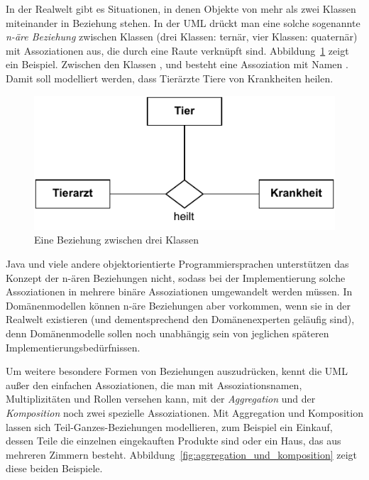 In der Realwelt gibt es Situationen, in denen Objekte von mehr als zwei Klassen miteinander in Beziehung stehen. In der UML drückt man eine solche sogenannte \textit{\mbox{n-äre} Beziehung} zwischen Klassen (\zb drei Klassen: ternär, vier Klassen: quaternär) mit Assoziationen aus, die durch eine Raute verknüpft sind. Abbildung~\ref{fig:tierarzt_tier_krankheit} zeigt ein Beispiel. Zwischen den Klassen ,  und  besteht eine Assoziation mit Namen . Damit soll modelliert werden, dass Tierärzte Tiere von Krankheiten heilen.

\begin{figure}[h!]
	\centering
	\includegraphics{Bilder/Kapitel-4/tierarzt_tier_krankheit.pdf}
	\caption{Eine Beziehung zwischen drei Klassen}
	\label{fig:tierarzt_tier_krankheit}
\end{figure}

\pagebreak %

Java und viele andere objektorientierte Programmiersprachen unterstützen das Konzept der n-ären Beziehungen nicht, sodass bei der Implementierung solche Assoziationen in mehrere binäre Assoziationen umgewandelt werden müssen. In Domänenmodellen können n-äre Beziehungen aber vorkommen, wenn sie in der Realwelt existieren (und dementsprechend den Domänenexperten geläufig sind), denn Domänenmodelle sollen noch unabhängig sein von jeglichen späteren Implementierungsbedürfnissen.

\label{sec:Kap-3.2.5.3:besondere_assoziationen}

Um weitere besondere Formen von Beziehungen auszudrücken, kennt die UML außer den einfachen Assoziationen, die man mit Assoziationsnamen, Multiplizitäten und Rollen versehen kann, mit der \textit{Aggregation} und der \textit{Komposition} noch zwei spezielle Assoziationen. Mit Aggregation und Komposition lassen sich Teil-Ganzes-Beziehungen modellieren, zum Beispiel ein Einkauf, dessen Teile die einzelnen eingekauften Produkte sind oder ein Haus, das aus mehreren Zimmern besteht. Abbildung~\ref{fig:aggregation_und_komposition} zeigt diese beiden Beispiele. 

